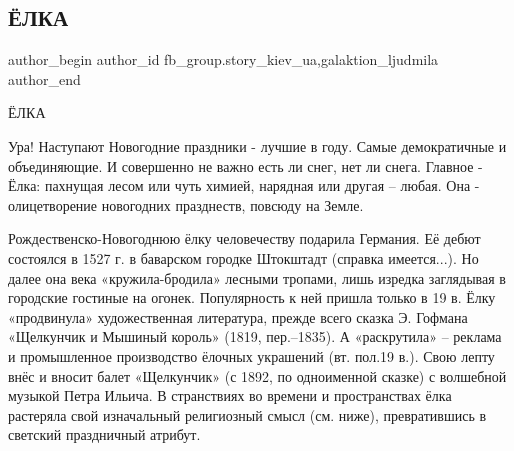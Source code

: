  
 
 
 
 
 
\subsection{ЁЛКА}
\label{sec:24_12_2021.fb.fb_group.story_kiev_ua.3.jolka}
 
\ifcmt
 author_begin
   author_id fb_group.story_kiev_ua,galaktion_ljudmila
 author_end
\fi

ЁЛКА

Ура! Наступают Новогодние праздники - лучшие в году.  Самые демократичные и
объединяющие. И совершенно не важно есть ли снег, нет ли снега. Главное - Ёлка:
пахнущая лесом или чуть химией, нарядная или другая – любая. Она -
олицетворение новогодних празднеств, повсюду на Земле. 

Рождественско-Новогоднюю ёлку человечеству подарила Германия. Её дебют
состоялся в 1527 г. в баварском городке Штокштадт (справка имеется...). Но далее
она века «кружила-бродила» лесными тропами, лишь изредка заглядывая в городские
гостиные на огонек. Популярность к ней пришла только в 19 в. Ёлку «продвинула»
художественная литература, прежде всего сказка Э. Гофмана «Щелкунчик и Мышиный
король» (1819, пер.–1835). А «раскрутила» – реклама и промышленное производство
ёлочных украшений (вт. пол.19 в.). Свою лепту внёс и вносит балет «Щелкунчик»
(с 1892, по одноименной сказке) с волшебной музыкой Петра Ильича. В странствиях
во времени и пространствах ёлка растеряла свой изначальный религиозный смысл
(см. ниже), превратившись в светский праздничный атрибут.


